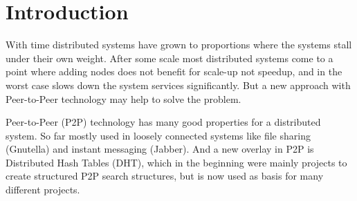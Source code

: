 
\section{Introduction}
\label{sec:introduction}



With time distributed systems have grown to proportions where the systems stall
 under their own weight. After some scale most distributed systems come to a
 point where adding nodes does not benefit for scale-up not speedup, and in
 the worst case slows down the system services significantly. But a new approach
 with Peer-to-Peer technology may help to solve the problem.

Peer-to-Peer (P2P) technology has many good properties for a distributed
 system. So far mostly used in loosely connected systems like file sharing
 (Gnutella\cite{gnutella-homepage}) and instant messaging
 (Jabber\cite{jabber-homepage}). And a new overlay in P2P is
 Distributed Hash Tables (DHT), which in the beginning were mainly
 projects to create structured P2P search structures, but is now used as basis
 for many different projects.

